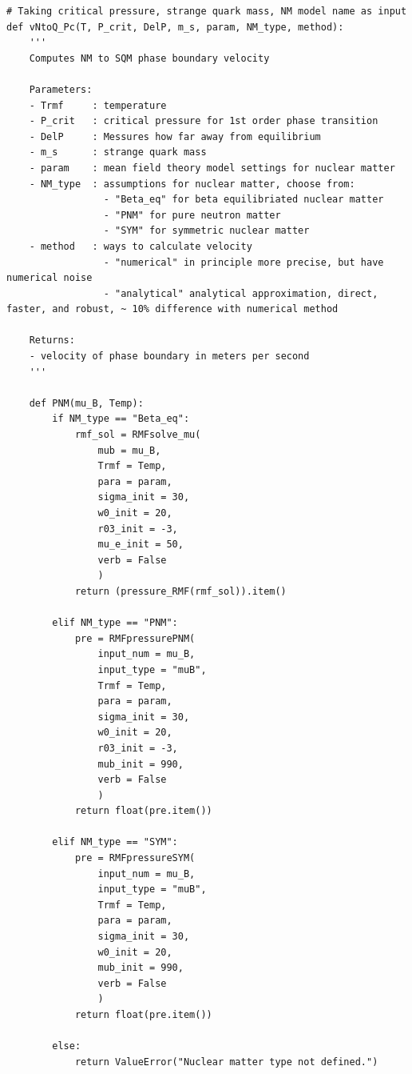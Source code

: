\documentclass[12pt]{article}
\begin{document}
\begin{lstlisting}[style=mypython]
# Taking critical pressure, strange quark mass, NM model name as input
def vNtoQ_Pc(T, P_crit, DelP, m_s, param, NM_type, method):
    '''
    Computes NM to SQM phase boundary velocity 

    Parameters:
    - Trmf     : temperature
    - P_crit   : critical pressure for 1st order phase transition
    - DelP     : Messures how far away from equilibrium
    - m_s      : strange quark mass
    - param    : mean field theory model settings for nuclear matter
    - NM_type  : assumptions for nuclear matter, choose from:
                 - "Beta_eq" for beta equilibriated nuclear matter
                 - "PNM" for pure neutron matter
                 - "SYM" for symmetric nuclear matter
    - method   : ways to calculate velocity
                 - "numerical" in principle more precise, but have numerical noise
                 - "analytical" analytical approximation, direct, faster, and robust, ~ 10% difference with numerical method

    Returns:
    - velocity of phase boundary in meters per second
    '''

    def PNM(mu_B, Temp):
        if NM_type == "Beta_eq":
            rmf_sol = RMFsolve_mu(
                mub = mu_B,
                Trmf = Temp,
                para = param,
                sigma_init = 30,
                w0_init = 20,
                r03_init = -3,
                mu_e_init = 50,
                verb = False
                )
            return (pressure_RMF(rmf_sol)).item()

        elif NM_type == "PNM":
            pre = RMFpressurePNM(
                input_num = mu_B,
                input_type = "muB", 
                Trmf = Temp, 
                para = param, 
                sigma_init = 30, 
                w0_init = 20, 
                r03_init = -3, 
                mub_init = 990,
                verb = False
                )
            return float(pre.item())

        elif NM_type == "SYM":
            pre = RMFpressureSYM(
                input_num = mu_B,
                input_type = "muB", 
                Trmf = Temp, 
                para = param, 
                sigma_init = 30, 
                w0_init = 20, 
                mub_init = 990,
                verb = False
                )
            return float(pre.item())

        else:
            return ValueError("Nuclear matter type not defined.")



\end{lstlisting}
\end{document}

